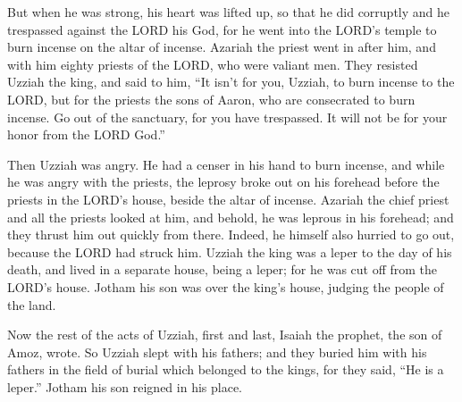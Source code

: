 \myverse{}But when he was strong, his heart was lifted up, so that he
did corruptly and he trespassed against the LORD his God, for he went into the LORD’s temple to burn incense
on the altar of incense.
\myverse{}Azariah the priest went in after him, and with him eighty priests of the
LORD, who were valiant men.
\myverse{}They resisted Uzziah the king, and said to him, “It isn’t for you, Uzziah,
to burn incense to the LORD, but for the priests the sons of Aaron, who are consecrated to burn incense.
Go out of the sanctuary, for you have trespassed. It will not be for your honor from the LORD God.”

\myverse{}Then Uzziah was angry. He had a censer in his hand to burn incense,
and while he was angry with the priests, the leprosy broke out on his forehead before the priests in the
LORD’s house, beside the altar of incense.
\myverse{}Azariah the chief priest and all the priests looked at him, and behold, he
was leprous in his forehead; and they thrust him out quickly from there. Indeed, he himself also hurried
to go out, because the LORD had struck him.
\myverse{}Uzziah the king was a leper to the day of his death, and lived in a separate
house, being a leper; for he was cut off from the LORD’s house. Jotham his son was over the king’s house,
judging the people of the land.

\myverse{}Now the rest of the acts of Uzziah, first and last, Isaiah the
prophet, the son of Amoz, wrote.
\myverse{}So Uzziah slept with his fathers; and they buried him with his fathers in
the field of burial which belonged to the kings, for they said, “He is a leper.” Jotham his son reigned
in his place.


